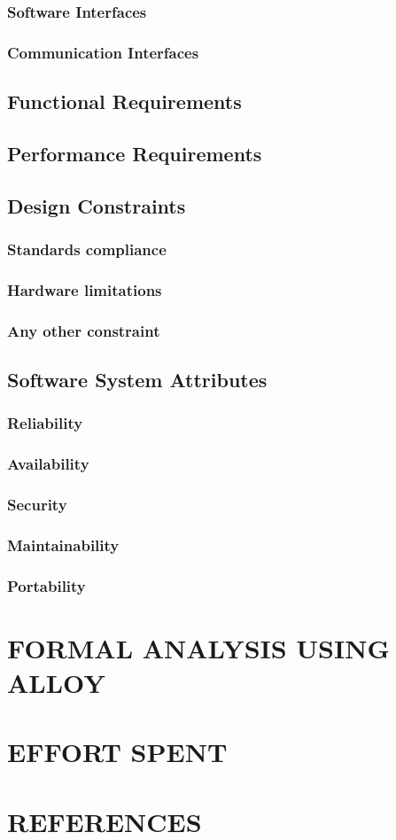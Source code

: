 \documentclass{article}
\begin{document}
\subsubsection{Software Interfaces}
\subsubsection{Communication Interfaces}
\subsection{Functional Requirements}
\subsection{Performance Requirements}
\subsection{Design Constraints}
\subsubsection{Standards compliance}
\subsubsection{Hardware limitations}
\subsubsection{Any other constraint}
\subsection{Software System Attributes}
\subsubsection{Reliability}
\subsubsection{Availability}
\subsubsection{Security}
\subsubsection{Maintainability}
\subsubsection{Portability}

\section{FORMAL ANALYSIS USING ALLOY}

\section{EFFORT SPENT}

\section{REFERENCES}
\end{document}
